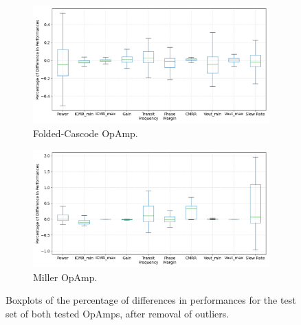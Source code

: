 \documentclass[conference]{IEEEtran}
\begin{document}
	\begin{figure}[]
		\begin{subfigure}{.5\textwidth}
			\centering
			\includegraphics[width=\linewidth]{figures/BoxplotFCA}
			\setlength{\abovecaptionskip}{0ex}%
			\setlength{\belowcaptionskip}{0ex}%
			\caption{Folded-Cascode OpAmp.}
			\label{fig:boxplotfca}
		\end{subfigure}
		\hfill
		\begin{subfigure}{.5\textwidth}
			\centering
			\includegraphics[width=\linewidth]{figures/BoxplotMillerOpAmp}
			\setlength{\abovecaptionskip}{-0.5ex}%
			\caption{Miller OpAmp.}
			\label{fig:boxplotmiller}
		\end{subfigure}
		\setlength{\abovecaptionskip}{3ex}%
		\setlength{\belowcaptionskip}{-3ex}%
		\caption{Boxplots of the percentage of differences in performances for the test set of both tested OpAmps, after removal of outliers. }
		\label{fig:boxplots}
	\end{figure}
	
\end{document}
